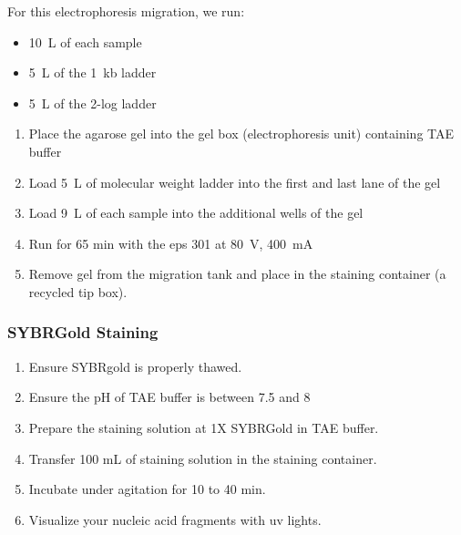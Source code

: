 For this electrophoresis migration, we run:
\begin{itemize}
\item 10~\textmu L of each sample 
\item 5~\textmu L of the 1~kb ladder
\item 5~\textmu L of the 2-log ladder
\end{itemize}

\begin{enumerate}
\item Place the agarose gel into the gel box (electrophoresis unit) containing TAE buffer
\item Load 5~\textmu L of molecular weight ladder into the first and last lane of the gel
\item Load 9~\textmu L of each sample into the additional wells of the gel
\item Run for 65 min with the \gls{eps} 301 at 80~V, 400~mA
\item Remove gel from the migration tank and place in the staining container (a recycled tip box).
\end{enumerate}


\subsubsection{SYBR\cR Gold Staining}

\begin{enumerate}
\item Ensure SYBR\cR gold is properly thawed.
\item Ensure the pH of TAE buffer is between 7.5 and 8
\item Prepare the staining solution at 1X SYBR\cR Gold in TAE buffer.
\item Transfer 100 mL of staining solution in the staining container.
\item Incubate under agitation for 10 to 40 min.
\item Visualize your nucleic acid fragments with \gls{uv} lights.
\end{enumerate}

